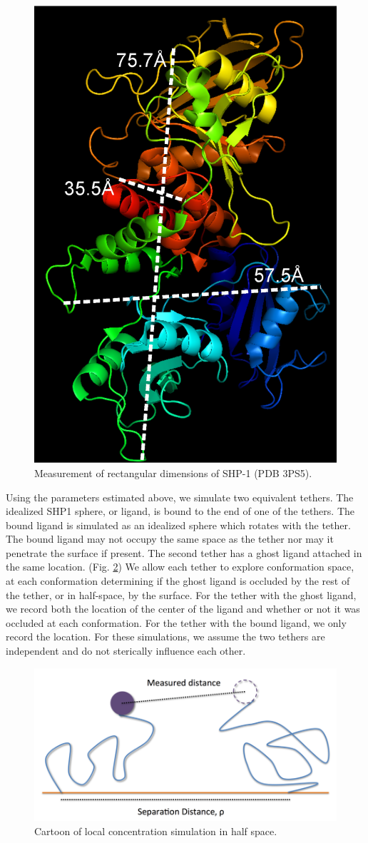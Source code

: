 \documentclass[../../AdvancementSummary.tex]{subfiles}
\begin{document}
\begin{figure}[H]
\begin{center}
\includegraphics[width=0.4\linewidth]{ResultsFigures/SHP1PyMol/LengthWidthDepth.eps}
\end{center}
\caption{Measurement of rectangular dimensions of SHP-1 (PDB 3PS5). \label{fig: SHP1Rectangle} }
\end{figure}

Using the parameters estimated above, we simulate two equivalent tethers. The idealized SHP1 sphere, or ligand, is bound to the end of one of the tethers. The bound ligand is simulated as an idealized sphere which rotates with the tether. The bound ligand may not occupy the same space as the tether nor may it penetrate the surface if present. The second tether has a ghost ligand attached in the same location. (Fig. \ref{fig: LocalConcCartoon}) We allow each tether to explore conformation space, at each conformation determining if the ghost ligand is occluded by the rest of the tether, or in half-space, by the surface. For the tether with the ghost ligand, we record both the location of the center of the ligand and whether or not it was occluded at each conformation. For the tether with the bound ligand, we only record the location. For these simulations, we assume the two tethers are independent and do not sterically influence each other.

\begin{figure}
\includegraphics[width=\linewidth]{Diagram.png}
\caption{Cartoon of local concentration simulation in half space. \label{fig: LocalConcCartoon}}
\end{figure}
\end{document}
